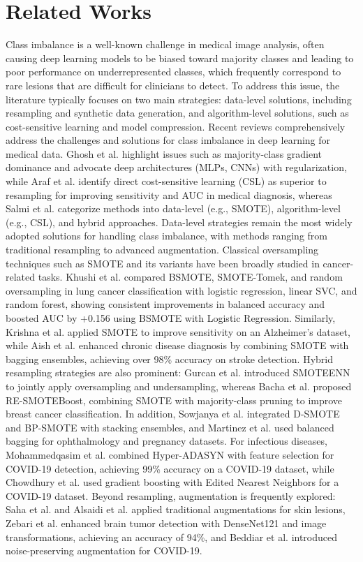 \documentclass[twocolumn]{svjour3}
\begin{document}
\section{Related Works}
Class imbalance is a well-known challenge in medical image analysis, often causing deep learning models to be biased toward majority classes and leading to poor performance on underrepresented classes, which frequently correspond to rare lesions that are difficult for clinicians to detect. To address this issue, the literature typically focuses on two main strategies: data-level solutions, including resampling and synthetic data generation, and algorithm-level solutions, such as cost-sensitive learning and model compression.
Recent reviews comprehensively address the challenges and solutions for class imbalance in deep learning for medical data. Ghosh et al. \cite{ref10} highlight issues such as majority-class gradient dominance and advocate deep architectures (MLPs, CNNs) with regularization, while Araf et al. \cite{ref11} identify direct cost-sensitive learning (CSL) as superior to resampling for improving sensitivity and AUC in medical diagnosis, whereas Salmi et al. \cite{ref12} categorize methods into data-level (e.g., SMOTE), algorithm-level (e.g., CSL), and hybrid approaches.
Data-level strategies remain the most widely adopted solutions for handling class imbalance, with methods ranging from traditional resampling to advanced augmentation. Classical oversampling techniques such as SMOTE and its variants have been broadly studied in cancer-related tasks. Khushi et al. \cite{ref13} compared BSMOTE, SMOTE-Tomek, and random oversampling in lung cancer classification with logistic regression, linear SVC, and random forest, showing consistent improvements in balanced accuracy and boosted AUC by +0.156 using BSMOTE with Logistic Regression. Similarly, Krishna et al. \cite{ref14} applied SMOTE to improve sensitivity on an Alzheimer’s dataset, while Aish et al. \cite{ref15} enhanced chronic disease diagnosis by combining SMOTE with bagging ensembles, achieving over 98\% accuracy on stroke detection. Hybrid resampling strategies are also prominent: Gurcan et al. \cite{ref16} introduced SMOTEENN to jointly apply oversampling and undersampling, whereas Bacha et al. \cite{ref17} proposed RE-SMOTEBoost, combining SMOTE with majority-class pruning to improve breast cancer classification. In addition, Sowjanya et al. \cite{ref18} integrated D-SMOTE and BP-SMOTE with stacking ensembles, and Martinez et al. \cite{ref19} used balanced bagging for ophthalmology and pregnancy datasets. For infectious diseases, Mohammedqasim et al. \cite{ref20} combined Hyper-ADASYN with feature selection for COVID-19 detection, achieving 99\% accuracy on a COVID-19 dataset, while Chowdhury et al. \cite{ref21} used gradient boosting with Edited Nearest Neighbors for a COVID-19 dataset. Beyond resampling, augmentation is frequently explored: Saha et al. \cite{ref22} and Alsaidi et al. \cite{ref23} applied traditional augmentations for skin lesions, Zebari et al. \cite{ref24} enhanced brain tumor detection with DenseNet121 and image transformations, achieving an accuracy of 94\%, and Beddiar et al. \cite{ref25} introduced noise-preserving augmentation for COVID-19.
\end{document}
